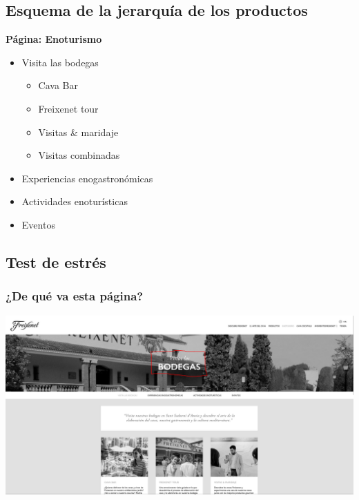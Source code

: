 \documentclass[spanish]{article}
\begin{document}
\subsection{Esquema de la jerarquía de los productos}

\textbf{Página: Enoturismo}

\begin{itemize}

        \item Visita las bodegas
        \begin{itemize}

                \item Cava Bar
                \item Freixenet tour
                \item Visitas \& maridaje
                \item Visitas combinadas

        \end{itemize}
        \item Experiencias enogastronómicas
        \item Actividades enoturísticas
        \item Eventos

\end{itemize}

\newpage

\subsection{Test de estrés}

\subsubsection{¿De qué va esta página?}

\begin{center}
        \includegraphics[scale=.1]{../img/1.png}
\end{center}
\end{document}

